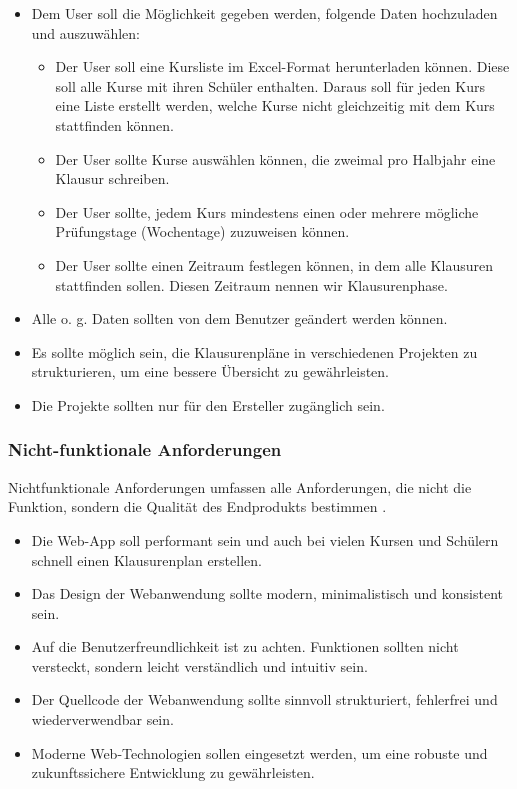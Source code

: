 \begin{itemize}
    \item Dem User soll die Möglichkeit gegeben werden, folgende Daten hochzuladen und auszuwählen:
    
    \begin{itemize}
        \item Der User soll eine Kursliste im Excel-Format herunterladen können. Diese soll alle Kurse mit ihren Schüler enthalten. Daraus soll für jeden Kurs eine Liste erstellt werden, welche Kurse nicht gleichzeitig mit dem Kurs stattfinden können.
        
        \item Der User sollte Kurse auswählen können, die zweimal pro Halbjahr eine Klausur schreiben.
        
        \item Der User sollte, jedem Kurs mindestens einen oder mehrere mögliche Prüfungstage (Wochentage) zuzuweisen können.
        
        \item Der User sollte einen Zeitraum festlegen können, in dem alle Klausuren stattfinden sollen. Diesen Zeitraum nennen wir Klausurenphase.
    \end{itemize}
    
    \item Alle o. g. Daten sollten von dem Benutzer geändert werden können. 
    
    \item Es sollte möglich sein, die Klausurenpläne in verschiedenen Projekten zu strukturieren, um eine bessere Übersicht zu gewährleisten. 
    \item Die Projekte sollten nur für den Ersteller zugänglich sein.
\end{itemize}
\subsubsection{Nicht-funktionale Anforderungen}
Nichtfunktionale Anforderungen umfassen alle Anforderungen, die nicht die Funktion, sondern die Qualität des Endprodukts bestimmen \parencite{anforderungen}.
\begin{itemize}
    \item Die Web-App soll performant sein und auch bei vielen Kursen und Schülern schnell einen Klausurenplan erstellen.
    \item Das Design der Webanwendung sollte modern, minimalistisch und konsistent sein.
    \item Auf die Benutzerfreundlichkeit ist zu achten. Funktionen sollten nicht versteckt, sondern leicht verständlich und intuitiv  sein.
    \item Der Quellcode der Webanwendung sollte sinnvoll strukturiert, fehlerfrei und wiederverwendbar sein.
    \item Moderne Web-Technologien sollen eingesetzt werden, um eine robuste und zukunftssichere Entwicklung zu gewährleisten.
\end{itemize}
